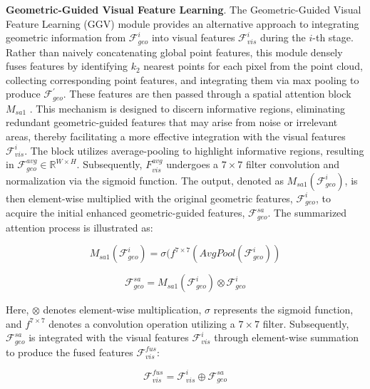 \textbf{Geometric-Guided Visual Feature Learning}. The Geometric-Guided Visual Feature Learning (GGV) module provides an alternative approach to integrating geometric information from $\mathcal{F}_{geo}^{i}$ into visual features $\mathcal{F}_{vis}^{i}$ during the $i$-th stage. Rather than naively concatenating global point features, this module densely fuses features by identifying $k_{2}$ nearest points for each pixel from the point cloud, collecting corresponding point features, and integrating them via max pooling to produce $\mathcal{F}_{geo}^{'}$. These features are then passed through a spatial attention block $\mathit{M}_{sa1}$ \cite{woo2018cbam}. This mechanism is designed to discern informative regions, eliminating redundant geometric-guided features that may arise from noise or irrelevant areas, thereby facilitating a more effective integration with the visual features $\mathcal{F}_{vis}^{i}$. The block utilizes average-pooling to highlight informative regions, resulting in $\mathcal{F}_{geo}^{avg} \in \mathbb{R}^{W \times H}$. Subsequently, $F_{vis}^{avg}$ undergoes a $7 \times 7$ filter convolution and normalization via the sigmoid function. The output, denoted as $\mathit{M}_{sa1}(\mathcal{F}_{geo}^{i})$, is then element-wise multiplied with the original geometric features, $\mathcal{F}_{geo}^{i}$, to acquire the initial enhanced geometric-guided features, $\mathcal{F}_{geo}^{sa}$. The summarized attention process is illustrated as:

\begin{equation} 
\mathit{M}_{sa1}(\mathcal{F}_{geo}^{i}) = \sigma(f^{7 \times 7}(AvgPool(\mathcal{F}_{geo}^{i})) 
\end{equation}

\begin{equation} 
\mathcal{F}_{geo}^{sa} = \mathit{M}_{sa1}(\mathcal{F}_{geo}^{i}) \otimes \mathcal{F}_{geo}^{i}
\end{equation}

\noindent Here, $\otimes$ denotes element-wise multiplication, $\sigma$ represents the sigmoid function, and $f^{7 \times 7}$ denotes a convolution operation utilizing a $7 \times 7$ filter. Subsequently, $\mathcal{F}_{geo}^{sa}$ is integrated with the visual features $\mathcal{F}_{vis}^{i}$ through element-wise summation to produce the fused features $\mathcal{F}_{vis}^{fus}$:

\begin{equation} 
\mathcal{F}_{vis}^{fus} = \mathcal{F}_{vis}^{i} \oplus \mathcal{F}_{geo}^{sa}
\end{equation}

